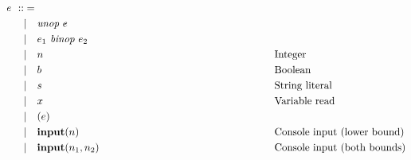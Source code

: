 \begin{fleqn}
\begin{align*}
                 & \hspace{-0.1cm}                  &    &                                       &  &                                                        \\
                 & \textit{e} \hspace{-0.1cm}       & :: & =                                     &  &                                                        \\
                 & \hspace{-0.1cm}                  &    & | \ \ \ \textit{unop } e              &  &                                                        \\
                 & \hspace{-0.1cm}                  &    & | \ \ \ e_1 \textit{ binop } e_2      &  &                                                        \\
                 & \hspace{-0.1cm}                  &    & | \ \ \ n                             &  & \hspace*{5.6cm}\text{Integer}                          \\
                 & \hspace{-0.1cm}                  &    & | \ \ \ b                             &  & \hspace*{5.6cm}\text{Boolean}                          \\
                 & \hspace{-0.1cm}                  &    & | \ \ \ s                             &  & \hspace*{5.6cm}\text{String literal}                   \\
                 & \hspace{-0.1cm}                  &    & | \ \ \ x                             &  & \hspace*{5.6cm}\text{Variable read}                    \\
                 & \hspace{-0.1cm}                  &    & | \ \ \ (e)                           &  &                                                        \\
                 &                                  &    & | \ \ \ \textbf{input}(n)             &  & \hspace*{5.6cm}\text{Console input (lower bound)}      \\
                 &                                  &    & | \ \ \ \textbf{input}(n_1, n_2)      &  & \hspace*{5.6cm}\text{Console input (both bounds)}      \\

\end{align*}
\end{fleqn}
